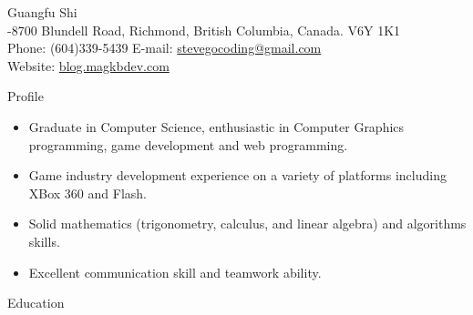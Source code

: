 \documentclass[10pt]{article}
\newenvironment{myitemize}{\begin{itemize} %
        \setlength{\itemsep}{0.25em} 
        \setlength{\topsep}{\itemsep} 
        \setlength{\labelsep}{1em}
        \setlength{\parskip}{0em}
        \setlength{\partopsep}{0em}
}%
{ \end{itemize} }
\begin{document}
 
\date{}
\newlength{\oldcvlabelwidth}
\newlength{\oldcvlabelsep}



\begin{cv} {{\large Guangfu Shi}\\
    { \normalsize {}-8700 Blundell Road, Richmond, British Columbia, Canada. V6Y 1K1\\ 
    Phone: {\mdseries (604)339-5439}  
    \hfill E-mail: {\mdseries \href{mailto:stevegocoding@gmail.com} {stevegocoding@gmail.com}} \\
	Website: \url{blog.magkbdev.com}
    }
}


\setlength{\oldcvlabelwidth}{\cvlabelwidth}
\setlength{\oldcvlabelsep}{\cvlabelsep}
\setlength{\cvlabelwidth}{0.5em}

%

\begin{cvlist}{Profile} 
\item
    \begin{myitemize}
        	\item Graduate in Computer Science, enthusiastic in Computer Graphics programming, game development and web programming.
        	\item Game industry development experience on a variety of platforms including XBox 360 and Flash.
        	\item Solid mathematics (trigonometry, calculus, and linear algebra) and algorithms skills. 
        	\item Excellent communication skill and teamwork ability. 
    \end{myitemize}
\end{cvlist}


\setlength{\cvlabelwidth}{1em}

\begin{cvlist}{Education}
    

\end{cvlist}
\end{cv}
\end{document}
